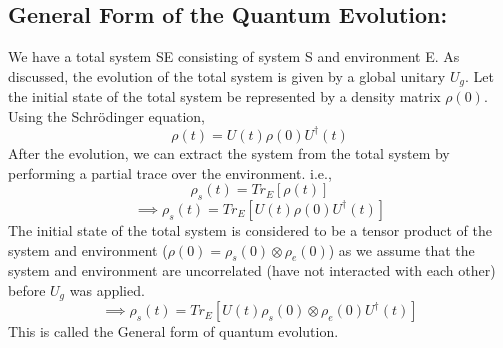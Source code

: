 \subsection{General Form of the Quantum Evolution:}
We have a total system SE consisting of system S and environment E. As discussed, the evolution of the total system is given by a global unitary $U_g$. Let the initial state of the total system be represented by a density matrix $\rho(0)$. Using the Schr\"{o}dinger equation,
\begin{equation}
   \rho(t) = U(t)\rho(0)U^\dagger(t)
\end{equation}
After the evolution, we can extract the system from the total system by performing a partial trace over the environment. i.e.,
\begin{equation}
    \rho_s(t) = Tr_E[\rho(t)]
\end{equation}
\begin{equation}
    \implies \rho_s(t) = Tr_E[U(t)\rho(0)U^\dagger(t)]
\end{equation}
The initial state of the total system is considered to be a tensor product of the system and environment ($\rho(0) = \rho_s(0) \otimes \rho_e(0)$) as we assume that the system and environment are uncorrelated (have not interacted with each other) before $U_g$ was applied.
\begin{equation}
    \implies \rho_s(t) = Tr_E[U(t)\rho_s(0) \otimes \rho_e(0)U^\dagger(t)]
\end{equation}
This is called the General form of quantum evolution. 

